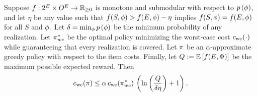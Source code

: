 \begin{theorem} \label{thm:min-set-cover-wc-generalized-with-costs}
Suppose $f:2^{E} \times O^{E} \to
\mathbb{R}_{\ge 0}$ 
is \term monotone and \term submodular
with respect to ${\color{black}{\ensuremath{p \left( {{\color{black}{\ensuremath{\phi}}}} \right) }}}$, and 
let $\eta$ be any value such that 
$f(S, {\color{black}{\ensuremath{\phi}}}) > f(E, {\color{black}{\ensuremath{\phi}}}) - \eta$ implies $f(S, {\color{black}{\ensuremath{\phi}}}) =
f(E, {\color{black}{\ensuremath{\phi}}})$ for all $S$ and ${\color{black}{\ensuremath{\phi}}}$.
Let $\delta = \min_{{\color{black}{\ensuremath{\phi}}}} {\color{black}{\ensuremath{p \left( {{\color{black}{\ensuremath{\phi}}}} \right) }}}$ be the minimum probability of
any realization.
Let $\pi_{wc}^{*}$ be the optimal policy
minimizing the worst-case cost ${c_{\text{wc}}{(\cdot)}}$
while guaranteeing that every realization is covered.  Let $\pi$ be an $\alpha$-approximate
greedy policy with respect to the item costs.  
Finally, let $Q := \mathbb{E}\left[f(E, {\color{black}{\ensuremath{\Phi}}})\right]$ be the
maximum possible expected reward.  
Then 
\[
 {c_{\text{wc}}{(\pi)}} \le \alpha \, {c_{\text{wc}}{(\pi_{wc}^*)}}\,
  \left( {\ln  \left( {\frac{Q}{\delta \eta}} \right)  +1} \right) 
\mbox{.}
\]
\end{theorem}

